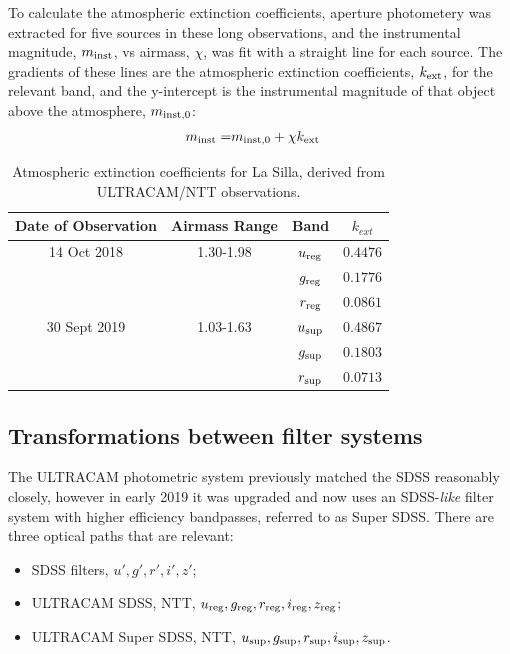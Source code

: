 To calculate the atmospheric extinction coefficients, aperture photometery was extracted for five sources in these long observations, and the instrumental magnitude, $m_{\rm inst}$, vs airmass, $\chi$, was fit with a straight line for each source. 
The gradients of these lines are the atmospheric extinction coefficients, $k_{\rm ext}$, for the relevant band, and the y-intercept is the instrumental magnitude of that object above the atmosphere, $m_{\rm inst,0}$:
\begin{align*}
    m_{\rm inst} =& m_{\rm inst,0} + \chi k_{\rm ext} 
\end{align*}

\begin{table}
    \centering
    \caption{Atmospheric extinction coefficients for La Silla, derived from ULTRACAM/NTT observations.}
    \label{table:atmos_extinction}
    \begin{tabular}{cccc}
        \hline
        Date of Observation & Airmass Range & Band & $k_{ext}$ \\
        \hline
        \hline
        14 Oct 2018   & 1.30-1.98 & $u_{\rm reg}$ & $0.4476$ \\
                      &           & $g_{\rm reg}$ & $0.1776$ \\
                      &           & $r_{\rm reg}$ & $0.0861$ \\
        \hline
        30 Sept 2019  & 1.03-1.63 & $u_{\rm sup}$ & $0.4867$ \\
                      &           & $g_{\rm sup}$ & $0.1803$ \\
                      &           & $r_{\rm sup}$ & $0.0713$ \\
        \hline
    \end{tabular}
\end{table}


\subsection{Transformations between filter systems}
\label{sect:observations:colour correction method}

The ULTRACAM photometric system previously matched the SDSS reasonably closely, however in early 2019 it was upgraded and now uses an SDSS-\emph{like} filter system with higher efficiency bandpasses, referred to as Super SDSS. There are three optical paths that are relevant:
\begin{itemize}
\item SDSS filters, $u', g', r', i', z'$;
\item ULTRACAM SDSS, NTT, $u_{\rm reg}, g_{\rm reg}, r_{\rm reg}, i_{\rm reg}, z_{\rm reg}$;
\item ULTRACAM Super SDSS,  NTT, $u_{\rm sup}, g_{\rm sup}, r_{\rm sup}, i_{\rm sup}, z_{\rm sup}$.
\end{itemize}

